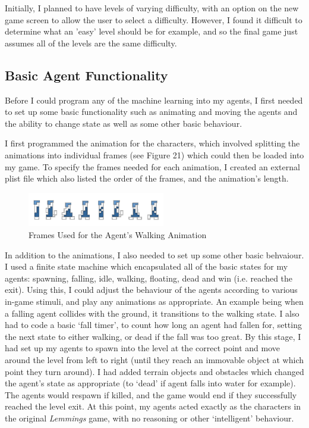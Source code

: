 \documentclass[a4paper,oneside]{report}
\begin{document}
Initially, I planned to have levels of varying difficulty, with an option on the new game screen to allow the user to select a difficulty. However, I found it difficult to determine what an 'easy' level should be for example, and so the final game just assumes all of the levels are the same difficulty. 

\subsection{Basic Agent Functionality}

Before I could program any of the machine learning into my agents, I first needed to set up some basic functionality such as animating and moving the agents and the ability to change state as well as some other basic behaviour.

I first programmed the animation for the characters, which involved splitting the animations into individual frames (see Figure 21) which could then be loaded into my game. To specify the frames needed for each animation, I created an external plist file which also listed the order of the frames, and the animation's length. 

\begin{figure}[h!]
  \centering
    \includegraphics[width=60mm]{sources/images/Lemming_walk_anim}
    \caption{Frames Used for the Agent's Walking Animation}
\end{figure}

In addition to the animations, I also needed to set up some other basic behvaiour. I used a finite state machine which encapsulated all of the basic states for my agents: spawning, falling, idle, walking, floating, dead and win (i.e. reached the exit). Using this, I could adjust the behaviour of the agents according to various in-game stimuli, and play any animations as appropriate. An example being when a falling agent collides with the ground, it transitions to the walking state. I also had to code a basic `fall timer', to count how long an agent had fallen for, setting the next state to either walking, or dead if the fall was too great. By this stage, I had set up my agents to spawn into the level at the correct point and move around the level from left to right (until they reach an immovable object at which point they turn around). I had added terrain objects and obstacles which changed the agent's state as appropriate (to `dead' if agent falls into water for example). The agents would respawn if killed, and the game would end if they successfully reached the level exit. At this point, my agents acted exactly as the characters in the original \emph{Lemmings} game, with no reasoning or other `intelligent' behaviour.
\end{document}
